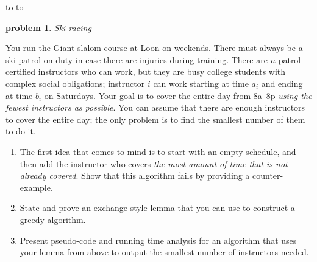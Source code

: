 \documentclass[11pt]{article}
\newcommand{\handout}{
   \renewcommand{\thepage}{H\hnumber-\arabic{page}}%
   \noindent%
   \begin{center}%
      \vbox{%
    \hbox to \columnwidth {\sc{\course} --- abhi shelat \hfill}%
    \vspace{-2mm}%
    \hbox to \columnwidth {\sc due \MakeLowercase{\duedate} \duelocation\hfill {\Huge\color{mdb}H\hnumber.\yourname}}%
      }
   \end{center}
   \vspace*{2mm}
}
\newtheorem{problem}{\sc\color{cit}problem}
\begin{document}
\handout

\begin{problem}Ski racing\end{problem}
You run the Giant slalom course at Loon on weekends. There must always be a ski patrol on duty in case there are injuries during training.  There are $n$ patrol certified instructors who can work, but they are busy college students with complex social obligations; instructor $i$ can work starting at time $a_i$ and ending at time $b_i$ on Saturdays.  Your goal is to cover the entire day from 8a--8p \emph{using the fewest instructors as possible}. You can assume that there are enough instructors to cover the entire day; the only problem is to find the smallest number of them to do it.

\begin{enumerate}
    \item The first idea that comes to mind is to start with an empty schedule, and then add the instructor who covers \emph{the most amount of time that is not already covered}.  Show that this algorithm fails by providing a counter-example.

    \item  State and prove an exchange style lemma that you can use to construct a greedy algorithm.
    
    \item Present pseudo-code and running time analysis for an algorithm that uses your lemma from above to output the smallest number of instructors needed.
\end{enumerate}
\end{document}
